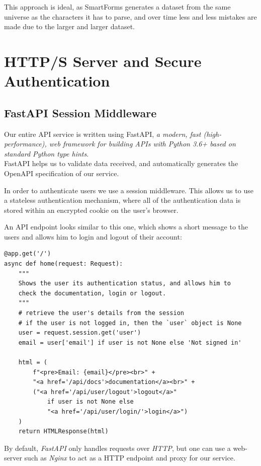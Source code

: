 \documentclass[11pt, a4paper]{report}
\begin{document}
This approach is ideal, as SmartForms generates a dataset from the same universe as the characters it has to parse, and over time less and less mistakes are made due to the larger and larger dataset.

\chapter{HTTP/S Server and Secure Authentication}

\section{FastAPI Session Middleware}

Our entire API service is written using FastAPI, \textit{a modern, fast (high-performance), web framework for building APIs with Python 3.6+ based on standard Python type hints}\cite{FastAPI}.
\\
FastAPI helps us to validate data received, and automatically generates the OpenAPI\cite{open-api} specification of our service.

In order to authenticate users we use a session middleware. This allows us to use a stateless authentication mechanism, where all of the authentication data is stored within an encrypted cookie on the user's browser.

An API endpoint looks similar to this one, which shows a short message to the users and allows him to login and logout of their account:

\begin{verbatim}
@app.get('/')
async def home(request: Request):
    """
    Shows the user its authentication status, and allows him to
    check the documentation, login or logout.
    """
    # retrieve the user's details from the session
    # if the user is not logged in, then the `user` object is None
    user = request.session.get('user')
    email = user['email'] if user is not None else 'Not signed in'

    html = (
        f"<pre>Email: {email}</pre><br>" +
        "<a href='/api/docs'>documentation</a><br>" +
        ("<a href='/api/user/logout'>logout</a>"
            if user is not None else
            "<a href='/api/user/login/'>login</a>")
    )
    return HTMLResponse(html)
\end{verbatim}

By default, \textit{FastAPI} only handles requests over \textit{HTTP}, but one can use a web-server such as \textit{Nginx}\cite{nginx} to act as a HTTP endpoint and proxy for our service.
\end{document}
